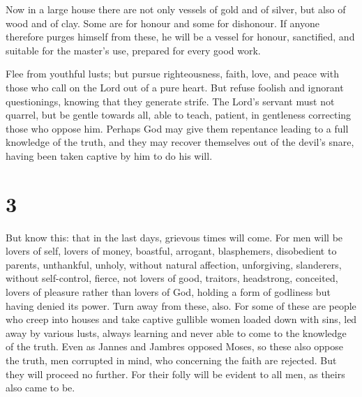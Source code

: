  Now in a large house there are not only vessels of gold
and of silver, but also of wood and of clay. Some are for honour and
some for dishonour.  If anyone therefore purges himself
from these, he will be a vessel for honour, sanctified, and suitable for
the master's use, prepared for every good work.

 Flee from youthful lusts; but pursue righteousness,
faith, love, and peace with those who call on the Lord out of a pure
heart.  But refuse foolish and ignorant questionings,
knowing that they generate strife.  The Lord's servant
must not quarrel, but be gentle towards all, able to teach, patient,
 in gentleness correcting those who oppose him. Perhaps
God may give them repentance leading to a full knowledge of the truth,
 and they may recover themselves out of the devil's
snare, having been taken captive by him to do his will.

\hypertarget{section-2}{%
\section{3}\label{section-2}}

 But know this: that in the last days, grievous times will
come.  For men will be lovers of self, lovers of money,
boastful, arrogant, blasphemers, disobedient to parents, unthankful,
unholy,  without natural affection, unforgiving,
slanderers, without self-control, fierce, not lovers of good,
 traitors, headstrong, conceited, lovers of pleasure
rather than lovers of God,  holding a form of godliness
but having denied its power. Turn away from these, also. 
For some of these are people who creep into houses and take captive
gullible women loaded down with sins, led away by various lusts,
 always learning and never able to come to the knowledge
of the truth.  Even as Jannes and Jambres opposed Moses,
so these also oppose the truth, men corrupted in mind, who concerning
the faith are rejected.  But they will proceed no further.
For their folly will be evident to all men, as theirs also came to be.

